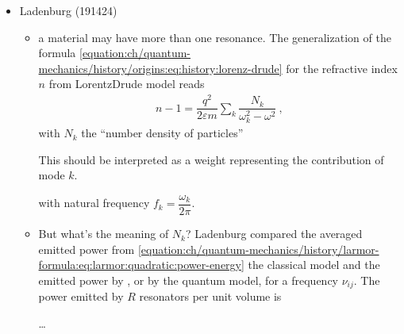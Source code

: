 \documentclass[letterpaper,10pt,english]{jupyterBook}
\begin{document}
\begin{itemize}
\begin{itemize}
\end{itemize}

\item {} 
\sphinxAtStartPar
Ladenburg (1914\sphinxhyphen{}24)
\begin{itemize}
\item {} 
\sphinxAtStartPar
a material may have more than one resonance. The generalization of the formula \eqref{equation:ch/quantum-mechanics/history/origins:eq:history:lorenz-drude} for the refractive index \(n\) from Lorentz\sphinxhyphen{}Drude model reads
\begin{equation*}
\begin{split}n - 1 = \dfrac{q^2}{2 \varepsilon m} \sum_{k} \dfrac{N_k}{\omega_k^2 - \omega^2} \ ,\end{split}
\end{equation*}
\sphinxAtStartPar
with \(N_k\) the “number density of particles”%
\begin{footnote}[1]\sphinxAtStartFootnote
This should be interpreted as a weight representing the contribution of mode \(k\).
%
\end{footnote} with natural frequency \(f_k = \dfrac{\omega_k}{2 \pi}\).

\item {} 
\sphinxAtStartPar
But what’s the meaning of \(N_k\)? Ladenburg compared the averaged emitted power from {\hyperref[\detokenize{ch/quantum-mechanics/history/larmor-formula:moving-charge-radiation}]{}} \eqref{equation:ch/quantum-mechanics/history/larmor-formula:eq:larmor:quadratic:power-energy} \sphinxhyphen{} the classical model \sphinxhyphen{} and the emitted power by {\hyperref[\detokenize{ch/quantum-mechanics/history::doc}]{}}, or by {\hyperref[\detokenize{ch/quantum-mechanics/history::doc}]{}} \sphinxhyphen{} the quantum model, for a frequency \(\nu_{ij}\). The power emitted by \(R\) resonators per unit volume is

\sphinxAtStartPar
…



\end{itemize}
\end{itemize}
\end{document}
